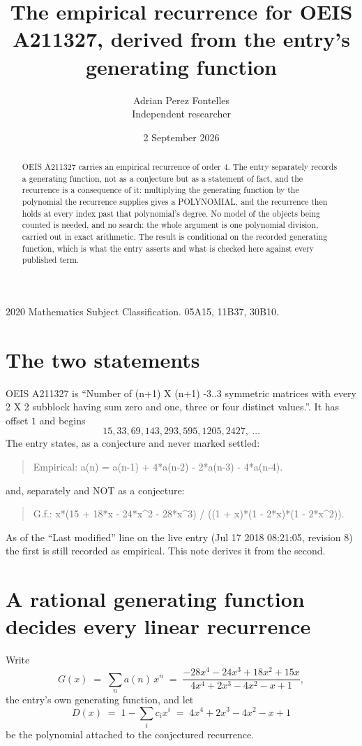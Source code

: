 \documentclass[11pt,a4paper]{article}
\title{The empirical recurrence for OEIS A211327, derived from the entry's generating function}
\author{Adrian Perez Fontelles\\ \small Independent researcher}
\date{2 September 2026}
\theoremstyle{plain}
\theoremstyle{definition}
\begin{document}
\maketitle

\begin{abstract}
OEIS A211327 carries an empirical recurrence of order $4$. The entry separately records a
generating function, not as a conjecture but as a statement of fact, and the recurrence is a
consequence of it: multiplying the generating function by the polynomial the recurrence
supplies gives a POLYNOMIAL, and the recurrence then holds at every index past that
polynomial's degree. No model of the objects being counted is needed, and no search: the
whole argument is one polynomial division, carried out in exact arithmetic. The result is
conditional on the recorded generating function, which is what the entry asserts and what is
checked here against every published term.
\end{abstract}

\noindent\small 2020 Mathematics Subject Classification. 05A15, 11B37, 30B10.\normalsize

\section{The two statements}

OEIS A211327 is ``Number of (n+1) X (n+1) -3..3 symmetric matrices with every 2 X 2 subblock having sum zero and one, three or four distinct values.''. It has offset $1$ and begins
\[
15, 33, 69, 143, 293, 595, 1205, 2427,\ \dots
\]
The entry states, as a conjecture and never marked settled:
\begin{quote}
Empirical: a(n) = a(n-1) + 4*a(n-2) - 2*a(n-3) - 4*a(n-4).
\end{quote}
and, separately and NOT as a conjecture:
\begin{quote}
G.f.: x*(15 + 18*x - 24*x\^{}2 - 28*x\^{}3) / ((1 + x)*(1 - 2*x)*(1 - 2*x\^{}2)).
\end{quote}
As of the ``Last modified'' line on the live entry (Jul 17 2018 08:21:05, revision 8) the first is still
recorded as empirical. This note derives it from the second.

\section{A rational generating function decides every linear recurrence}

Write
\[
G(x)\;=\;\sum_{n}a(n)\,x^{n}\;=\;\frac{- 28 x^{4} - 24 x^{3} + 18 x^{2} + 15 x}{4 x^{4} + 2 x^{3} - 4 x^{2} - x + 1},
\]
the entry's own generating function, and let
\[
D(x)\;=\;1-\sum_i c_i x^{i}\;=\;4 x^{4} + 2 x^{3} - 4 x^{2} - x + 1
\]
be the polynomial attached to the conjectured recurrence.
\end{document}
